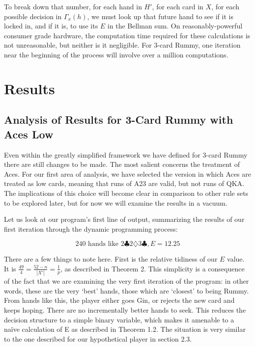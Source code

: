 \documentclass[paper=a4, fontsize=11pt,twoside]{report}   %
\begin{document}
To break down that number, for each hand in $H'$, for each card in $X$, for each possible decision in $\Gamma_x(h)$, we must look up that future hand to see if it is locked in, and if it is, to use its $E$ in the Bellman sum. On reasonably-powerful consumer grade hardware, the computation time required for these calculations is not unreasonable, but neither is it negligible. For 3-card Rummy, one iteration near the beginning of the process will involve over a million computations.

\section{Results}

\subsection{Analysis of Results for 3-Card Rummy with Aces Low}

Even within the greatly simplified framework we have defined for 3-card Rummy there are still changes to be made. The most salient concerns the treatment of Aces. For our first area of analysis, we have selected the version in which Aces are treated as low cards, meaning that runs of A23 are valid, but not runs of QKA. The implications of this choice will become clear in comparison to other rule sets to be explored later, but for now we will examine the results in a vacuum.

Let us look at our program’s first line of output, summarizing the results of our first iteration through the dynamic programming process: 

$$240 \textrm{ hands like }2\clubsuit 2\diamondsuit 3\clubsuit, E = 12.25$$ 

There are a few things to note here. First is the relative tidiness of our $E$ value. It is $\frac{49}{4} = \frac{52-n}{|X'|} = \frac{1}{p}$, as described in Theorem 2. This simplicity is a consequence of the fact that we are examining the very first iteration of the program: in other words, these are the very ‘best’ hands, those which are ‘closest’ to being Rummy. From hands like this, the player either goes Gin, or rejects the new card and keeps hoping. There are no incrementally better hands to seek. This reduces the decision structure to a simple binary variable, which makes it amenable to a naïve calculation of E as described in Theorem 1.2. The situation is very similar to the one described for our hypothetical player in section 2.3. 
\end{document}
